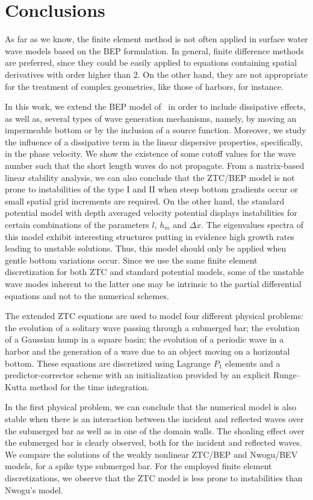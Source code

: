 \section{Conclusions}
As far as we know, the finite element method is not often
applied in surface water wave models based on the BEP
formulation.  In general, finite difference methods are
preferred, since they could be easily applied to equations
containing spatial derivatives with order higher than 2.  On
the other hand, they are not appropriate for the treatment
of complex geometries, like those of harbors, for instance.

In this work, we extend the BEP model
of~\citet{ZhaoTengCheng2004} in order to include dissipative
effects, as well as, several types of wave generation
mechanisms, namely, by moving an impermeable bottom or by
the inclusion of a source function.  Moreover, we study the
influence of a dissipative term in the linear dispersive
properties, specifically, in the phase velocity.  We show
the existence of some cutoff values for the wave number such
that the short length waves do not propagate.  From a
matrix-based linear stability analysis, we can also conclude
that the ZTC/BEP model is not prone to instabilities of the
type I and II when steep bottom gradients occur or small
spatial grid increments are required.  On the other hand, the
standard potential model with depth averaged velocity
potential displays instabilities for certain combinations of
the parameters $l$, $h_m$ and $\Delta x$. The eigenvalues
spectra of this model exhibit interesting structures
putting in evidence high growth rates leading to unstable
solutions. Thus, this model should only be applied when
gentle bottom variations occur.  Since we use the same
finite element discretization for both ZTC and standard
potential models, some of the unstable wave modes  inherent
to the latter one may be intrinsic to the partial differential
equations and not to the numerical schemes.


The extended ZTC equations are used to model four different
physical problems: the evolution of a solitary wave passing
through a submerged bar; the evolution of a Gaussian hump in
a square basin; the evolution of a periodic wave in a harbor
and the generation of a wave due to an object moving on a
horizontal bottom.  These equations are discretized using
Lagrange $P_1$ elements and a predictor-corrector scheme
with an initialization provided by an explicit Runge--Kutta
method for the time integration.

In the first physical
problem, we can conclude that the numerical model is also
stable when there is an interaction between the incident and
reflected waves over the submerged bar as well as in one of
the domain walls. The shoaling effect over the submerged bar
is clearly observed, both for the incident and reflected
waves.  We compare the solutions of the weakly nonlinear
ZTC/BEP and Nwogu/BEV models, for a spike type submerged
bar.  For the employed finite element discretizations, we
observe that the ZTC model is less prone to instabilities
than Nwogu's model.


